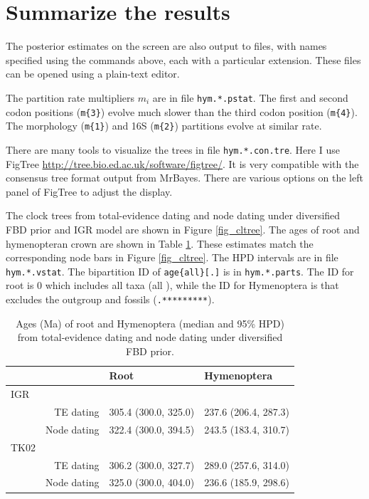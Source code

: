 \documentclass[12pt]{article}
\begin{document}
\section{Summarize the results}

The posterior estimates on the screen are also output to files, with names specified using the commands above, each with a particular extension. 
These files can be opened using a plain-text editor. 

The partition rate multipliers $m_i$ are in file {\tt hym.*.pstat}. 
The first and second codon positions ({\tt m\{3\}}) evolve much slower than the third codon position ({\tt m\{4\}}). The morphology ({\tt m\{1\}}) and 16S ({\tt m\{2\}}) partitions evolve at similar rate.

There are many tools to visualize the trees in file {\tt hym.*.con.tre}.
Here I use FigTree \url{http://tree.bio.ed.ac.uk/software/figtree/}.
It is very compatible with the consensus tree format output from MrBayes.
There are various options on the left panel of FigTree to adjust the display.

The clock trees from total-evidence dating and node dating under diversified FBD prior and IGR model are shown in Figure \ref{fig_cltree}.
The ages of root and hymenopteran crown are shown in Table \ref{tab_age}.
These estimates match the corresponding node bars in Figure \ref{fig_cltree}.
The HPD intervals are in file {\tt hym.*.vstat}.
The bipartition ID of {\tt age\{all\}[.]} is in {\tt hym.*.parts}.
The ID for root is 0 which includes all taxa (all {\tt *}), while the ID for Hymenoptera is that excludes the outgroup and fossils ({\tt .*********}). 

\begin{table}[p]
\caption{Ages (Ma) of root and Hymenoptera (median and 95\% HPD) from total-evidence dating and node dating under diversified FBD prior.} 
\label{tab_age} 
\begin{tabular}{lrll}
\hline
    &               & Root                 & Hymenoptera          \\
\hline
IGR &               &                      &                      \\
    &  TE dating    & 305.4 (300.0, 325.0) & 237.6 (206.4, 287.3) \\
    &  Node dating  & 322.4 (300.0, 394.5) & 243.5 (183.4, 310.7) \\
TK02&               &                      &                      \\
    &  TE dating    & 306.2 (300.0, 327.7) & 289.0 (257.6, 314.0) \\
    &  Node dating  & 325.0 (300.0, 404.0) & 236.6 (185.9, 298.6) \\
\hline 
\end{tabular}
\end{table}
\end{document}
